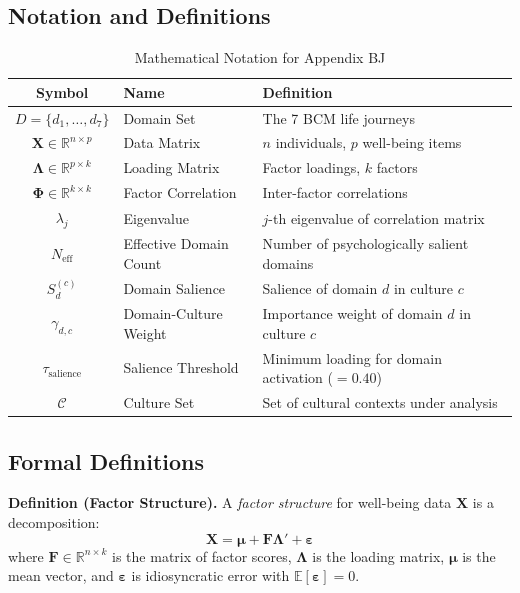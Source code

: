 \subsection{Notation and Definitions}

\begin{table}[htbp]
\centering
\caption{Mathematical Notation for Appendix BJ}
\label{tab:bj-notation}
\renewcommand{\arraystretch}{1.3}
\small
\begin{tabular}{@{}clp{6cm}@{}}
\toprule
\textbf{Symbol} & \textbf{Name} & \textbf{Definition} \\
\midrule
$D = \{d_1, \ldots, d_7\}$ & Domain Set & The 7 BCM life journeys \\
$\mathbf{X} \in \mathbb{R}^{n \times p}$ & Data Matrix & $n$ individuals, $p$ well-being items \\
$\boldsymbol{\Lambda} \in \mathbb{R}^{p \times k}$ & Loading Matrix & Factor loadings, $k$ factors \\
$\boldsymbol{\Phi} \in \mathbb{R}^{k \times k}$ & Factor Correlation & Inter-factor correlations \\
$\lambda_j$ & Eigenvalue & $j$-th eigenvalue of correlation matrix \\
$N_{\text{eff}}$ & Effective Domain Count & Number of psychologically salient domains \\
$S_d^{(c)}$ & Domain Salience & Salience of domain $d$ in culture $c$ \\
$\gamma_{d,c}$ & Domain-Culture Weight & Importance weight of domain $d$ in culture $c$ \\
$\tau_{\text{salience}}$ & Salience Threshold & Minimum loading for domain activation ($= 0.40$) \\
$\mathcal{C}$ & Culture Set & Set of cultural contexts under analysis \\
\bottomrule
\end{tabular}
\end{table}

\subsection{Formal Definitions}

\begin{tcolorbox}[colback=gray!5!white, colframe=gray!75!black, title=Definition BJ-D1: Factor Structure]
\textbf{Definition (Factor Structure).}
A \textit{factor structure} for well-being data $\mathbf{X}$ is a decomposition:
\begin{equation}
\mathbf{X} = \boldsymbol{\mu} + \mathbf{F} \boldsymbol{\Lambda}' + \boldsymbol{\varepsilon}
\label{eq:bj-factor-model}
\end{equation}
where $\mathbf{F} \in \mathbb{R}^{n \times k}$ is the matrix of factor scores, $\boldsymbol{\Lambda}$ is the loading matrix,
$\boldsymbol{\mu}$ is the mean vector, and $\boldsymbol{\varepsilon}$ is idiosyncratic error with $\mathbb{E}[\boldsymbol{\varepsilon}] = 0$.
\end{tcolorbox}

